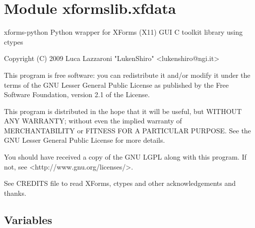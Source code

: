 %
%
%


\section{Module xformslib.xfdata}

    \label{xformslib:xfdata}
xforms-python Python wrapper for XForms (X11) GUI C toolkit library using 
ctypes

Copyright (C) 2009  Luca Lazzaroni "LukenShiro"  
{\textless}lukenshiro@ngi.it{\textgreater}

This program is free software: you can redistribute it and/or modify it 
under the terms of the GNU Lesser General Public License as published by 
the Free Software Foundation, version 2.1 of the License.

This program is distributed in the hope that it will be useful, but WITHOUT
ANY WARRANTY; without even the implied warranty of MERCHANTABILITY or 
FITNESS FOR A PARTICULAR PURPOSE.  See the GNU Lesser General Public 
License for more details.

You should have received a copy of the GNU LGPL along with this program. If
not, see {\textless}http://www.gnu.org/licenses/{\textgreater}.

See CREDITS file to read XForms, ctypes and other acknowledgements and 
thanks.



  \subsection{Variables}

